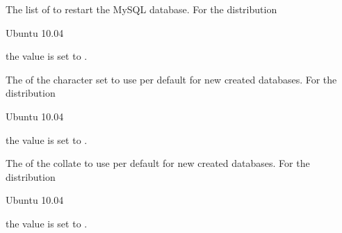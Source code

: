 The list of  to restart the MySQL database.
For the distribution
\begin{inparaitem}
\item[\TheDistribution{ubuntu}] Ubuntu 10.04
\end{inparaitem}
the value is set to .


The  of the character set to use per default for new created databases.
For the distribution
\begin{inparaitem}
\item[\TheDistribution{ubuntu}] Ubuntu 10.04
\end{inparaitem}
the value is set to .


The  of the collate to use per default for new created databases.
For the distribution
\begin{inparaitem}
\item[\TheDistribution{ubuntu}] Ubuntu 10.04
\end{inparaitem}
the value is set to .
 
